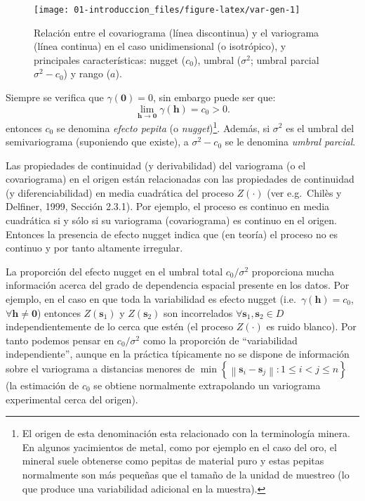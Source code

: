 \documentclass[
  spanish,
]{book}
\theoremstyle{break}
\theoremstyle{definition}
\theoremstyle{definition}
\theoremstyle{definition}
\theoremstyle{definition}
\theoremstyle{remark}
\begin{document}
\begin{figure}[!htb]

{\centering \texttt{[image: 01-introduccion\_files/figure-latex/var-gen-1]} 

}

\caption{Relación entre el covariograma (línea discontinua) y el variograma (línea continua) en el caso unidimensional (o isotrópico), y principales características: nugget (\(c_0\)), umbral (\(\sigma^2\); umbral parcial \(\sigma^2 - c_0\)) y rango (\(a\)).}\label{fig:var-gen}
\end{figure}

Siempre se verifica que \(\gamma (\mathbf{0})=0\), sin embargo puede ser que:
\[\lim \limits_{\mathbf{h}\rightarrow \mathbf{0}} \gamma(\mathbf{h}) = c_0 > 0.\]
entonces \(c_0\) se denomina \emph{efecto pepita} (o \emph{nugget})\footnote{El origen de esta denominación esta relacionado con la terminología minera. En algunos yacimientos de metal, como por ejemplo en el caso del oro, el mineral suele obtenerse como pepitas de material puro y estas pepitas normalmente son más pequeñas que el tamaño de la unidad de muestreo (lo que produce una variabilidad adicional en la muestra).}.
Además, si \(\sigma^{2}\) es el umbral del semivariograma (suponiendo que existe), a \(\sigma ^{2} -c_0\) se le denomina \emph{umbral parcial}.

Las propiedades de continuidad (y derivabilidad) del variograma (o el covariograma) en el origen están relacionadas con las propiedades de continuidad (y diferenciabilidad) en media cuadrática del proceso \(Z(\cdot)\) (ver e.g.~Chilès y Delfiner, 1999, Sección 2.3.1).
Por ejemplo, el proceso es continuo en media cuadrática si y sólo si su variograma (covariograma) es continuo en el origen. Entonces la presencia de efecto nugget indica que (en teoría) el proceso no es continuo y por tanto altamente irregular.

La proporción del efecto nugget en el umbral total \(c_0 /\sigma^{2}\) proporciona mucha información acerca del grado de dependencia espacial presente en los datos.
Por ejemplo, en el caso en que toda la variabilidad es efecto nugget (i.e.~\(\gamma (\mathbf{h})=c_0\), \(\forall \mathbf{h}\neq \mathbf{0}\)) entonces \(Z(\mathbf{s}_1)\) y \(Z(\mathbf{s}_2)\) son incorrelados \(\forall \mathbf{s}_1 ,\mathbf{s}_2 \in D\) independientemente de lo cerca que estén (el proceso \(Z(\cdot)\) es ruido blanco).
Por tanto podemos pensar en \(c_0 /\sigma^{2}\) como la proporción de ``variabilidad independiente'', aunque en la práctica típicamente no se dispone de información sobre el variograma a distancias menores de \(\min \left\{ \left\| \mathbf{s}_{i} -\mathbf{s}_{j} \right\| :1\leq i<j\leq n\right\}\) (la estimación de \(c_0\) se obtiene normalmente extrapolando un variograma experimental cerca del origen).
\end{document}

